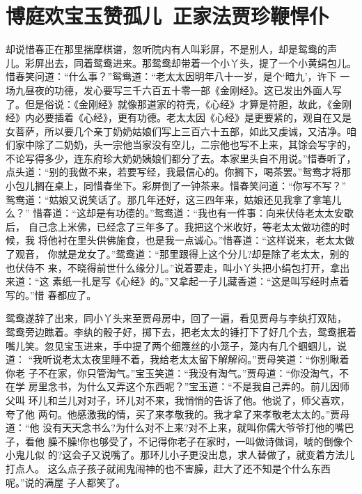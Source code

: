 \chapter{博庭欢宝玉赞孤儿~正家法贾珍鞭悍仆}

却说惜春正在那里揣摩棋谱，忽听院内有人叫彩屏，不是别人，却是鸳鸯的声
儿。彩屏出去，同着鸳鸯进来。那鸳鸯却带着一个小丫头，提了一个小黄绢包儿。
惜春笑问道：“什么事？”鸳鸯道：“老太太因明年八十一岁，是个‘暗九’，许下
一场九昼夜的功德，发心要写三千六百五十零一部《金刚经》。这已发出外面人写
了。但是俗说：《金刚经》就像那道家的符壳，《心经》才算是符胆，故此，《金刚
经》内必要插着《心经》，更有功德。老太太因《心经》是更要紧的，观自在又是
女菩萨，所以要几个亲丁奶奶姑娘们写上三百六十五部，如此又虔诚，又洁净。咱
们家中除了二奶奶，头一宗他当家没有空儿，二宗他也写不上来，其馀会写字的，
不论写得多少，连东府珍大奶奶姨娘们都分了去。本家里头自不用说。”惜春听了，
点头道：“别的我做不来，若要写经，我最信心的。你搁下，喝茶罢。”鸳鸯才将那
小包儿搁在桌上，同惜春坐下。彩屏倒了一钟茶来。惜春笑问道：“你写不写？”
鸳鸯道：“姑娘又说笑话了。那几年还好，这三四年来，姑娘还见我拿了拿笔儿么？”
惜春道：“这却是有功德的。”鸳鸯道：“我也有一件事：向来伏侍老太太安歇后，
自己念上米佛，已经念了三年多了。我把这个米收好，等老太太做功德的时候，我
将他衬在里头供佛施食，也是我一点诚心。”惜春道：“这样说来，老太太做了观音，
你就是龙女了。”鸳鸯道：“那里跟得上这个分儿?却是除了老太太，别的也伏侍不
来，不晓得前世什么缘分儿。”说着要走，叫小丫头把小绢包打开，拿出来道：“这
素纸一扎是写《心经》的。”又拿起一子儿藏香道：“这是叫写经时点着写的。”惜
春都应了。

鸳鸯遂辞了出来，同小丫头来至贾母房中，回了一遍，看见贾母与李纨打双陆，
鸳鸯旁边瞧着。李纨的骰子好，掷下去，把老太太的锤打下了好几个去，鸳鸯抿着
嘴儿笑。忽见宝玉进来，手中提了两个细篾丝的小笼子，笼内有几个蝈蝈儿，说道：
“我听说老太太夜里睡不着，我给老太太留下解解闷。”贾母笑道：“你别瞅着你老
子不在家，你只管淘气。”宝玉笑道：“我没有淘气。”贾母道：“你没淘气，不在学
房里念书，为什么又弄这个东西呢？”宝玉道：“不是我自己弄的。前儿因师父叫
环儿和兰儿对对子，环儿对不来，我悄悄的告诉了他。他说了，师父喜欢，夸了他
两句。他感激我的情，买了来孝敬我的。我才拿了来孝敬老太太的。”贾母道：“他
没有天天念书么?为什么对不上来?对不上来，就叫你儒大爷爷打他的嘴巴子，看他
臊不臊!你也够受了，不记得你老子在家时，一叫做诗做词，唬的倒像个小鬼儿似
的?这会子又说嘴了。那环儿小子更没出息，求人替做了，就变着方法儿打点人。
这么点子孩子就闹鬼闹神的也不害臊，赶大了还不知是个什么东西呢。”说的满屋
子人都笑了。


